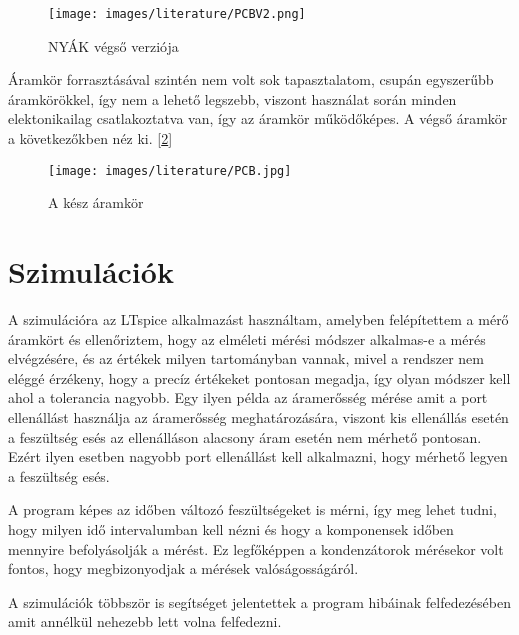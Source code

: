 \begin{figure}[h]
    \centering
    \texttt{[image: images/literature/PCBV2.png]}
    \caption{NYÁK végső verziója}
    \label{fig:PCBV2}
\end{figure}


Áramkör forrasztásával szintén nem volt sok tapasztalatom, csupán egyszerűbb
áramkörökkel, így nem a lehető legszebb, viszont használat során minden elektonikailag
csatlakoztatva van, így az áramkör működőképes. A végső áramkör a következőkben néz ki.
[\ref{fig:Aramkor}]


\begin{figure}[H]
    \centering
    \texttt{[image: images/literature/PCB.jpg]}
    \caption{A kész áramkör}
    \label{fig:Aramkor}
\end{figure}

\section{Szimulációk}

A szimulációra az LTspice \cite{LTspice} alkalmazást használtam, 
amelyben felépítettem a mérő áramkört és ellenőriztem, hogy az elméleti
mérési módszer alkalmas-e a mérés elvégzésére, és az értékek milyen
tartományban vannak, mivel a rendszer nem eléggé érzékeny, hogy a precíz
értékeket pontosan megadja, így olyan módszer kell ahol a tolerancia nagyobb.
Egy ilyen példa az áramerősség mérése amit a port ellenállást használja az
áramerősség meghatározására, viszont kis ellenállás esetén a
feszültség esés az ellenálláson alacsony áram esetén nem mérhető pontosan.
Ezért ilyen esetben nagyobb port ellenállást kell alkalmazni, hogy mérhető 
legyen a feszültség esés.

A program képes az időben változó feszültségeket is mérni, így
meg lehet tudni, hogy milyen idő intervalumban kell nézni és hogy
a komponensek időben mennyire befolyásolják a mérést. Ez 
legfőképpen a kondenzátorok mérésekor volt fontos, hogy megbizonyodjak
a mérések valóságosságáról.

A szimulációk többször is segítséget jelentettek a program 
hibáinak felfedezésében amit annélkül nehezebb lett volna felfedezni.

